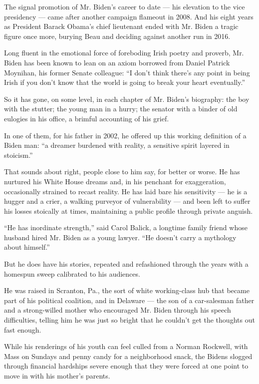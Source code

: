 The signal promotion of Mr. Biden's career to date --- his elevation to
the vice presidency --- came after another campaign flameout in 2008.
And his eight years as President Barack Obama's chief lieutenant ended
with Mr. Biden a tragic figure once more, burying Beau and deciding
against another run in 2016.

Long fluent in the emotional force of foreboding Irish poetry and
proverb, Mr. Biden has been known to lean on an axiom borrowed from
Daniel Patrick Moynihan, his former Senate colleague: ``I don't think
there's any point in being Irish if you don't know that the world is
going to break your heart eventually.''

So it has gone, on some level, in each chapter of Mr. Biden's biography:
the boy with the stutter; the young man in a hurry; the senator with a
binder of old eulogies in his office, a brimful accounting of his grief.

In one of them, for his father in 2002, he offered up this working
definition of a Biden man: ``a dreamer burdened with reality, a
sensitive spirit layered in stoicism.''

That sounds about right, people close to him say, for better or worse.
He has nurtured his White House dreams and, in his penchant for
exaggeration, occasionally strained to recast reality. He has laid bare
his sensitivity --- he is a hugger and a crier, a walking purveyor of
vulnerability --- and been left to suffer his losses stoically at times,
maintaining a public profile through private anguish.

``He has inordinate strength,'' said Carol Balick, a longtime family
friend whose husband hired Mr. Biden as a young lawyer. ``He doesn't
carry a mythology about himself.''

But he does have his stories, repeated and refashioned through the years
with a homespun sweep calibrated to his audiences.

He was raised in Scranton, Pa., the sort of white working-class hub that
became part of his political coalition, and in Delaware --- the son of a
car-salesman father and a strong-willed mother who encouraged Mr. Biden
through his speech difficulties, telling him he was just so bright that
he couldn't get the thoughts out fast enough.

While his renderings of his youth can feel culled from a Norman
Rockwell, with Mass on Sundays and penny candy for a neighborhood snack,
the Bidens slogged through financial hardships severe enough that they
were forced at one point to move in with his mother's parents.


